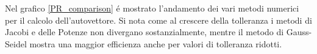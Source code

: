 
Nel grafico \ref{PR_comparison} \'e mostrato l'andamento dei vari metodi numerici per il calcolo dell'autovettore.
Si nota come al crescere della tolleranza i metodi di Jacobi e delle Potenze non divergano sostanzialmente, mentre il metodo di Gauss-Seidel mostra una maggior efficienza anche per valori di tolleranza ridotti.

